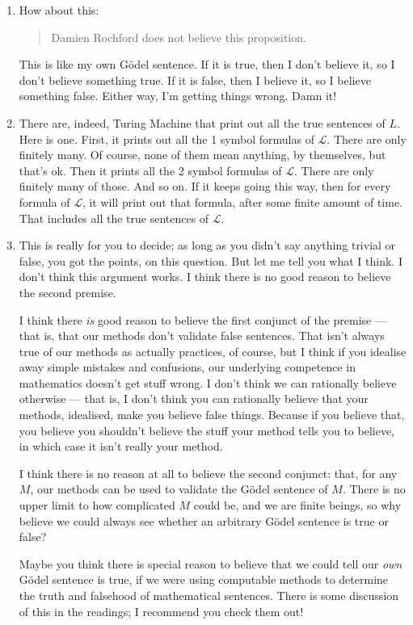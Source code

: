 \documentclass[12pt,a4paper]{article}
\begin{document}
\begin{enumerate}
\item How about this:
\begin{quote}
Damien Rochford does not believe this proposition.
\end{quote}
This is like my own G\"odel sentence. If it is true, then I don't believe it, so I don't believe something true. If it is false, then I believe it, so I believe something false. Either way, I'm getting things wrong. Damn it!

\item There are, indeed, Turing Machine that print out all the true sentences of $L$. Here is one. First, it prints out all the 1 symbol formulas of $\mathcal{L}$. There are only finitely many. Of course, none of them mean anything, by themselves, but that's ok. Then it prints all the 2 symbol formulas of $\mathcal{L}$. There are only finitely many of those. And so on. If it keeps going this way, then for every formula of $\mathcal{L}$, it will print out that formula, after some finite amount of time. That includes all the true sentences of $\mathcal{L}$.

\item This is really for you to decide; as long as you didn't say anything trivial or false, you got the points, on this question. But let me tell you what I think. I don't think this argument works. I think there is no good reason to believe the second premise. 

I think there \emph{is} good reason to believe the first conjunct of the premise --- that is, that our methods don't validate false sentences. That isn't always true of our methods as actually practices, of course, but I think if you idealise away simple mistakes and confusions, our underlying competence in mathematics doesn't get stuff wrong. I don't think we can rationally believe otherwise --- that is, I don't think you can rationally believe that your methods, idealised, make you believe false things. Because if you believe that, you believe you shouldn't believe the stuff your method tells you to believe, in which case it isn't really your method.

I think there is no reason at all to believe the second conjunct: that, for any $M$, our methods can be used to validate the G\"odel sentence of $M$. There is no upper limit to how complicated $M$ could be, and we are finite beings, so why believe we could always see whether an arbitrary G\"odel sentence is true or false?

Maybe you think there is special reason to believe that we could tell our \emph{own} G\"odel sentence is true, if we were using computable methods to determine the truth and falsehood of mathematical sentences. There is some discussion of this in the readings; I recommend you check them out!

\end {enumerate}
\end{document}
